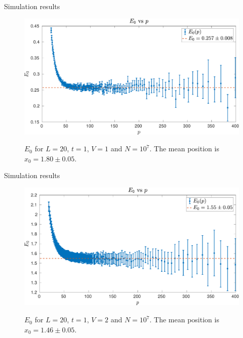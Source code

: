 \documentclass[10pt, compress, protectframetitle, handout]{beamer}
\begin{document}
\begin{frame}{Simulation results}

	\begin{figure}
		\centering
		\includegraphics[width=\textwidth]{Evsp-10E7}
		\label{fig:Evsp-10E7}
		\caption{$E_0$ for $L=20$, $t=1$, $V=1$ and $N=10^7$. The mean position is $x_0 = 1.80 \pm 0.05$.}
	\end{figure}
	
\end{frame}

\begin{frame}{Simulation results}

	\begin{figure}
		\centering
		\includegraphics[width=\textwidth]{Evsp-10E7-V2}
		\label{fig:Evsp-10E7-V2}
		\caption{$E_0$ for $L=20$, $t=1$, $V=2$ and $N=10^7$. The mean position is $x_0 = 1.46 \pm 0.05$.}
	\end{figure}
	
\end{frame}
\end{document}
